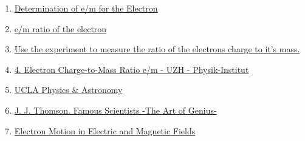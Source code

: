 \documentclass[../main.tex]{subfiles}
\begin{document}
\begin{enumerate}
\begin{enumerate}[1. ]
    \item \href{https://www.webassign.net/question_assets/unccolphyseml1/lab_4/manual.html}{Determination of e/m for the Electron}
    \item \href{https://physicsx.erau.edu/HelmholtzCoils/Lab_MP_1.pdf}{e/m ratio of the electron}
    \item \href{https://virtuelle-experimente.de/en/b-feld/e-m-bestimmung/edurchm.php}{Use the experiment to measure the ratio of the electrons charge to it's mass.}{}
    \item \href{https://www.physik.uzh.ch/~matthias/espace-assistant/manuals/en/anleitung_etom_e.pdf}{4. Electron Charge-to-Mass Ratio e/m - UZH - Physik-Institut}
    \item \href{https://demoweb.physics.ucla.edu/6b-lab-manual}{UCLA Physics \& Astronomy}
     \item \href{https://www.famousscientists.org/j-j-thomson/}{J. J. Thomson. Famous Scientists -The Art of Genius-}
     \item \href{https://virtuelle-experimente.de/en/index.php}{Electron Motion in Electric and Magnetic Fields}
\end{enumerate}


\end{enumerate}
\end{document}
